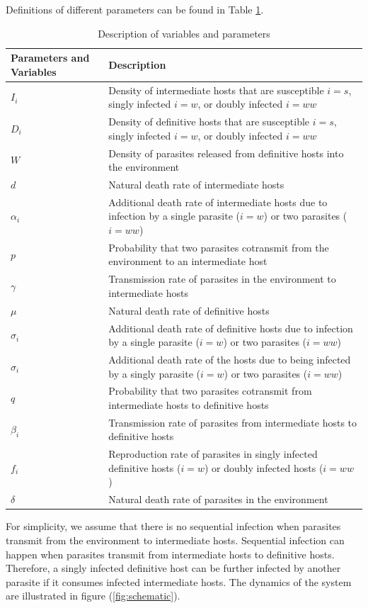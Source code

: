 \documentclass{article}
\begin{document}
Definitions of different parameters can be found in Table \ref{table:varpardescription}.
%
\begin{table}[!ht]
\begin{tabular}{|p{2.5cm}|p{12cm}|} 
\hline
Parameters and Variables    &  Description  \\
\hline
$I_i$  & Density of intermediate hosts that are susceptible $i=s$, singly infected $i=w$, or doubly infected $i=ww$ \\
\hline
$D_i$ & Density of definitive hosts that are susceptible $i=s$, singly infected $i=w$, or doubly infected $i=ww$ \\
\hline
$W$ & Density of parasites released from definitive hosts into the environment \\
\hline
$d$ & Natural death rate of intermediate hosts \\
\hline
$\alpha_i$ & Additional death rate of intermediate hosts due to infection by a single parasite ($i = w$) or two parasites ($i = ww$) \\
\hline
$p$ & Probability that two parasites cotransmit from the environment to an intermediate host \\
\hline
$\gamma$ & Transmission rate of parasites in the environment to intermediate hosts \\
\hline
$\mu$ & Natural death rate of definitive hosts \\
\hline
$\sigma_i$ & Additional death rate of definitive hosts due to infection by a single parasite ($i = w$) or two parasites ($i = ww$) \\
\hline
$\sigma_i$ & Additional death rate of the hosts due to being infected by a singly parasite ($i = w$) or two parasites ($i = ww$) \\
\hline
$q$ & Probability that two parasites cotransmit from intermediate hosts to definitive hosts \\
\hline
$\beta_i$ & Transmission rate of parasites from intermediate hosts to definitive hosts \\
\hline
$f_i$ & Reproduction rate of parasites in singly infected definitive hosts ($i = w$) or doubly infected hosts ($i = ww$)\\
\hline
$\delta$ & Natural death rate of parasites in the environment \\
\hline
\end{tabular}
\caption{Description of variables and parameters}
\label{table:varpardescription}
\end{table}

For simplicity, we assume that there is no sequential infection when parasites transmit from the environment to intermediate hosts. 
Sequential infection can happen when parasites transmit from intermediate hosts to definitive hosts. 
Therefore, a singly infected definitive host can be further infected by another parasite if it consumes infected intermediate hosts. 
The dynamics of the system are illustrated in figure (\ref{fig:schematic}).
\end{document}

